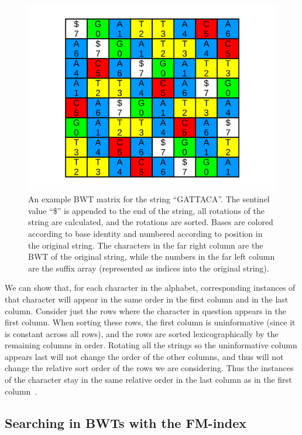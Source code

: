 \begin{figure}[ht]
    \centering
    \includegraphics[width=1.0\textwidth]{figures/01_introduction/bwt.png}
    \caption[An example BWT matrix for the string ``GATTACA'']{An example BWT matrix for the string ``GATTACA''. The sentinel value ``\$'' is appended to the end of the string, all rotations of the string are calculated, and the rotations are sorted. Bases are colored according to base identity and numbered according to position in the original string. The characters in the far right column are the BWT of the original string, while the numbers in the far left column are the suffix array (represented as indices into the original string).}
    \label{fig:bwt}
\end{figure}

We can show that, for each character in the alphabet, corresponding instances of that character will appear in the same order in the first column and in the last column. Consider just the rows where the character in question appears in the first column. When sorting these rows, the first column is uninformative (since it is constant across all rows), and the rows are sorted lexicographically by the remaining columns in order. Rotating all the strings so the uninformative column appears last will not change the order of the other columns, and thus will not change the relative sort order of the rows we are considering. Thus the instances of the character stay in the same relative order in the last column as in the first column~\cite{langmead2013introduction}.
    
\subsection{Searching in BWTs with the FM-index}


